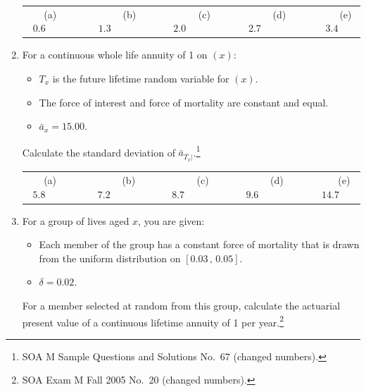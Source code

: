 \documentclass[11pt,fleqn,oneside]{book}
\begin{document}
\begin{enumerate}
\vspace{0.1cm}
\begin{center}
\small
\begin{tabular}{c c c c c}
(a) $0.6\;\;\;\;\;\;\;\;$ & 
$\;\;\;\;\;\;\;\;\;\;$(b) $1.3\;\;\;\;\;\;\;\;$ &
$\;\;\;\;\;\;\;\;\;\;$(c) $2.0\;\;\;\;\;\;\;\;$ & 
$\;\;\;\;\;\;\;\;\;\;$(d) $2.7\;\;\;\;\;\;\;\;$ &
$\;\;\;\;\;\;\;\;\;\;$(e) $3.4$
\end{tabular}
\end{center}
\vspace{0.1cm}

\item For a continuous whole life annuity of 1 on $(x)$:
\begin{itemize}
\item $T_x$ is the future lifetime random variable for $(x)$.
\item The force of interest and force of mortality are constant and equal.
\item $\bar{a}_x = 15.00.$ 
\end{itemize}
Calculate the standard deviation of $\bar{a}_{\overline{T_x}|}$.\footnote[4]{SOA M Sample Questions and Solutions No.\ 67 (changed numbers).}

\vspace{0.1cm}
\begin{center}
\small
\begin{tabular}{c c c c c}
(a) $5.8\;\;\;\;\;\;\;\;$ & 
$\;\;\;\;\;\;\;\;\;\;$(b) $7.2\;\;\;\;\;\;\;\;$ &
$\;\;\;\;\;\;\;\;\;\;$(c) $8.7\;\;\;\;\;\;\;\;$ & 
$\;\;\;\;\;\;\;\;\;\;$(d) $9.6\;\;\;\;\;\;\;\;$ &
$\;\;\;\;\;\;\;\;\;\;$(e) $14.7$
\end{tabular}
\end{center}
\vspace{0.1cm}

\normalsize

\item For a group of lives aged $x$, you are given:
\begin{itemize}
\item Each member of the group has a constant force of mortality that is drawn from the uniform distribution on $[0.03\,,\,0.05]$.
\item $\delta = 0.02$.
\end{itemize}
For a member selected at random from this group, calculate the actuarial present value of a continuous lifetime annuity of 1 per year.\footnote[5]{SOA Exam M Fall 2005 No.\ 20 (changed numbers).}


\end{enumerate}
\end{document}
